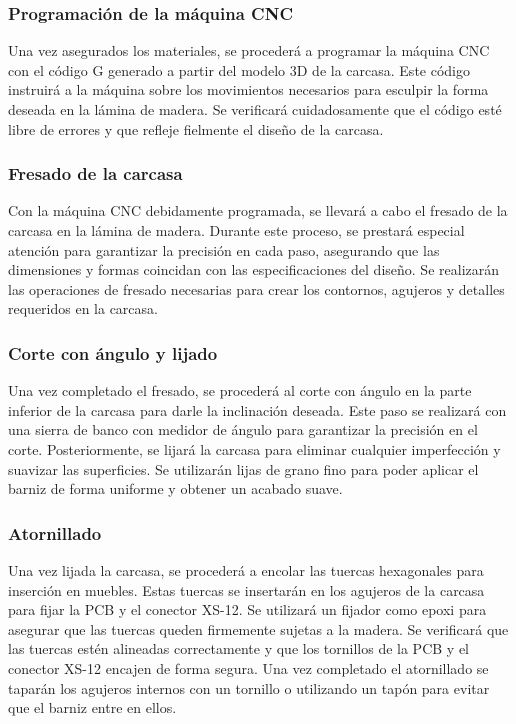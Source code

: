 \subsubsection{Programación de la máquina CNC}
Una vez asegurados los materiales, se procederá a programar la máquina CNC con el código G generado a partir del modelo 3D de la carcasa. Este código instruirá a la máquina sobre los movimientos necesarios para esculpir la forma deseada en la lámina de madera. Se verificará cuidadosamente que el código esté libre de errores y que refleje fielmente el diseño de la carcasa.

\subsubsection{Fresado de la carcasa}
Con la máquina CNC debidamente programada, se llevará a cabo el fresado de la carcasa en la lámina de madera. Durante este proceso, se prestará especial atención para garantizar la precisión en cada paso, asegurando que las dimensiones y formas coincidan con las especificaciones del diseño. Se realizarán las operaciones de fresado necesarias para crear los contornos, agujeros y detalles requeridos en la carcasa.

\subsubsection{Corte con ángulo y lijado}
Una vez completado el fresado, se procederá al corte con ángulo en la parte inferior de la carcasa para darle la inclinación deseada. Este paso se realizará con una sierra de banco con medidor de ángulo para garantizar la precisión en el corte. Posteriormente, se lijará la carcasa para eliminar cualquier imperfección y suavizar las superficies. Se utilizarán lijas de grano fino para poder aplicar el barniz de forma uniforme y obtener un acabado suave.

\subsubsection{Atornillado}
Una vez lijada la carcasa, se procederá a encolar las tuercas hexagonales para inserción en muebles. Estas tuercas se insertarán en los agujeros de la carcasa para fijar la PCB y el conector XS-12. Se utilizará un fijador como epoxi para asegurar que las tuercas queden firmemente sujetas a la madera. Se verificará que las tuercas estén alineadas correctamente y que los tornillos de la PCB y el conector XS-12 encajen de forma segura. Una vez completado el atornillado se taparán los agujeros internos con un tornillo o utilizando un tapón para evitar que el barniz entre en ellos.


